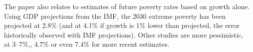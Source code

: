 The paper also relates to estimates of future poverty rates based on growth alone. Using GDP projections from the IMF, the 2030 extreme poverty has been projected at 2.8\% (and at 4.1\% if growth is 1\% lower than projected, the error historically observed with IMF projections).\cite{karver_mdgs_2012} Other studies are more pessimistic, at 3--7\%,\cite{chandy_final_2013,bicaba_can_2017}, 4.7\%\cite{manuel_financing_2018} or even 7.4\% for more recent estimates.\cite{lakner_how_2022} 

